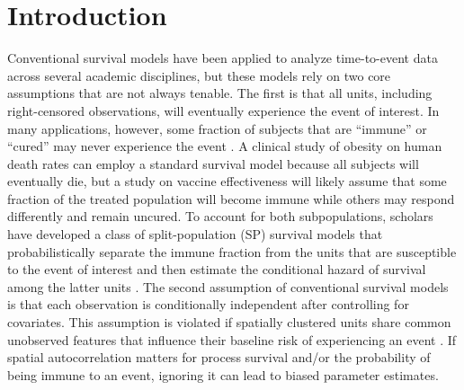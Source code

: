 \section{Introduction}
Conventional survival models have been applied to analyze time-to-event data across several academic disciplines, but these models rely on two core assumptions that are not always tenable. The first is that all units, including right-censored observations, will eventually experience the event of interest. In many applications, however, some fraction of subjects that are “immune” or “cured” may never experience the event \citep{maller1996survival,peng2014cure,beger2017splitting}. A clinical study of obesity on human death rates can employ a standard survival model because all subjects will eventually die, but a study on vaccine effectiveness will likely assume that some fraction of the treated population will become immune while others may respond differently and remain uncured. To account for both subpopulations, scholars have developed a class of split-population (SP) survival models that probabilistically separate the immune fraction from the units that are susceptible to the event of interest and then estimate the conditional hazard of survival among the latter units \citep{smcure-package,spduration-pkg, box1999modeling, boxsteffbook}. The second assumption of conventional survival models is that each observation is conditionally independent after controlling for covariates. This assumption is violated if spatially clustered units share common unobserved features that influence their baseline risk of experiencing an event  \citep{darmofal2009bayesian, taylor2017spatsurv}. If spatial autocorrelation matters for process survival and/or the probability of being immune to an event, ignoring it can lead to biased parameter estimates. 

